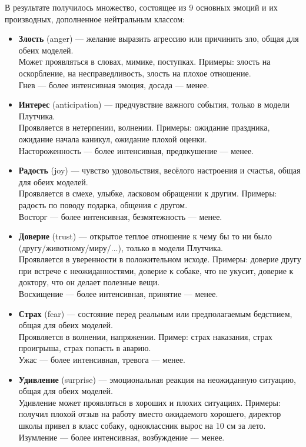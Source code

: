 В результате получилось множество, состоящее из 9 основных эмоций и их производных, дополненное нейтральным классом:

\bigskip
\begin{itemize}
\item \textbf{Злость} (anger) --- желание выразить агрессию или причинить зло, общая для обеих моделей.\\
Может проявляться в словах, мимике, поступках.
Примеры: злость на оскорбление, на несправедливость, злость на плохое отношение.\\
Гнев --- более интенсивная эмоция, досада --- менее.

\item \textbf{Интерес} (anticipation) --- предчувствие важного события, только в модели Плутчика.\\
Проявляется в нетерпении, волнении.
Примеры: ожидание праздника, ожидание начала каникул, ожидание плохой оценки.\\
Настороженность --- более интенсивная, предвкушение --- менее.

\item \textbf{Радость} (joy) --- чувство удовольствия, весёлого настроения и счастья, общая для обеих моделей.\\
Проявляется в смехе, улыбке, ласковом обращении к другим.
Примеры: радость по поводу подарка, общения с другом.\\
Восторг --- более интенсивная, безмятежность --- менее.

\item \textbf{Доверие} (trust) --- ​открытое теплое отношение к чему бы то ни было (другу/животному/миру/...), только в модели Плутчика.\\
Проявляется в уверенности в положительном исходе.
Примеры: доверие другу при встрече с неожиданностями, доверие к собаке, что не укусит, доверие к доктору, что он делает полезные вещи.\\
Восхищение --- более интенсивная, принятие --- менее.

\item \textbf{Страх} (fear) --- состояние перед реальным или предполагаемым бедствием, общая для обеих моделей.\\
Проявляется в волнении, напряжении.
Пример: страх наказания, страх проигрыша, страх попасть в аварию.\\
Ужас --- более интенсивная, тревога --- менее.

\item \textbf{Удивление} (surprise) --- эмоциональная реакция на неожиданную ситуацию, общая для обеих моделей.\\
Удивление может проявляться в хороших и плохих ситуациях.
Примеры: получил плохой отзыв на работу вместо ожидаемого хорошего, директор школы привел в класс собаку, одноклассник вырос на 10 см за лето.\\
Изумление --- более интенсивная, возбуждение --- менее.



\end{itemize}
